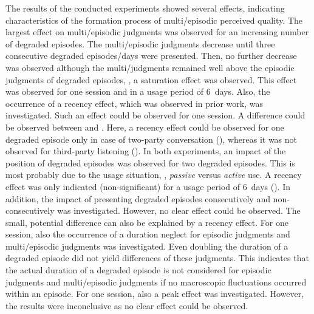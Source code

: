 The results of the conducted experiments showed several effects, indicating characteristics of the formation process of multi\-/episodic perceived quality.
The largest effect on multi\-/episodic judgments was observed for an increasing number of degraded episodes.
The multi\-/episodic judgments decrease until three consecutive degraded episodes/days were presented.
Then, no further decrease was observed although the multi\-/judgments remained well above the episodic judgments of degraded episodes, \ie, a saturation effect was observed.
This effect was observed for one session and in a usage period of 6~days.
Also, the occurrence of a recency effect, which was observed in prior work, was investigated.
Such an effect could be observed for one session.
A difference could be observed between  and \EIIa{}.
Here, a recency effect could be observed for one degraded episode only in case of two-party conversation (), whereas it was not observed for third-party listening (\EIIa{}).
In both experiments, an impact of the position of degraded episodes was observed for two degraded episodes.
This is most probably due to the usage situation, \ie, \emph{passive} versus \emph{active} use.
A recency effect was only indicated (non-significant) for a usage period of 6~days  ().
In addition, the impact of presenting degraded episodes consecutively and non-consecutively was investigated.
However, no clear effect could be observed.
The small, potential difference can also be explained by a recency effect.
For one session, also the occurrence of a duration neglect for episodic judgments and multi\-/episodic judgments was investigated.
Even doubling the duration of a degraded episode did not yield differences of these judgments.
This indicates that the actual duration of a degraded episode is not considered for episodic judgments and multi\-/episodic judgments if no macroscopic fluctuations occurred within an episode.
For one session, also a peak effect was investigated.
However, the results were inconclusive as no clear effect could be observed.

